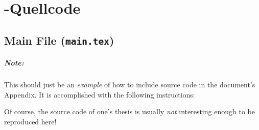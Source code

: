 \chapter{\latex-Quellcode}
\label{app:latex}

\section*{Main File (\texttt{main.tex})}

\paragraph{Note:}
This should just be an \emph{example} of how to include source code in the
document's Appendix. It is accomplished with the following instructions:
%
\begin{LaTeXCode}[numbers=none]
\begin{footnotesize}
	
\end{footnotesize}
\end{LaTeXCode}
%
Of course, the \latex source code of one's thesis is usually \emph{not} 
interesting enough to be reproduced here!

\begin{footnotesize}
	
\end{footnotesize}






